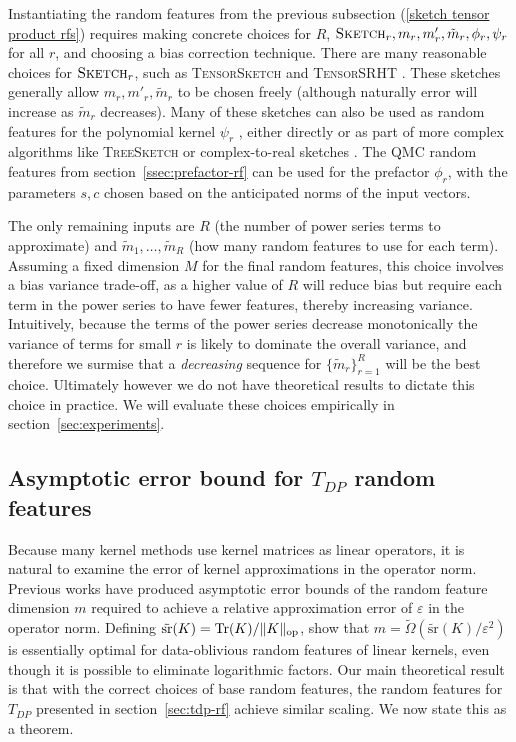 Instantiating the random features from the previous subsection (\ref{sketch tensor product rfs})
requires making concrete choices for $R$, $\textsc{Sketch}_r,m_r,m'_r,\tilde{m}_r,\phi_r,\psi_r$ for all $r$,
and choosing a bias correction technique.
There are many reasonable choices for $\textsc{Sketch}_r$, such as
\textsc{TensorSketch} \citep{pham2013fast}
and \textsc{TensorSRHT} \citep{ahle2020oblivious}.
These sketches generally allow $m_r,m'_r,\tilde{m}_r$ to be chosen freely
(although naturally error will increase as $\tilde{m}_r$ decreases).
Many of these sketches can also be used as random features for the polynomial kernel $\psi_r$ \citep{wacker2022improved},
either directly or as part of more complex algorithms like  \textsc{TreeSketch} \citep{ahle2020oblivious}
or complex-to-real sketches \citep{wacker2023complextoreal}.
The QMC random features from section~\ref{ssec:prefactor-rf} can be used for the prefactor $\phi_r$,
with the parameters $s,c$ chosen based on the anticipated norms of the input vectors.

The only remaining inputs are $R$ (the number of power series terms to approximate)
and $\tilde{m}_1,\ldots,\tilde{m}_R$ (how many random features to use for each term).
Assuming a fixed dimension $M$ for the final random features,
this choice involves a bias variance trade-off,
as a higher value of $R$ will reduce bias but require each term in the power series
to have fewer features, thereby increasing variance.
Intuitively, because the terms of the power series decrease monotonically
the variance of terms for small $r$ is likely to dominate the overall variance,
and therefore we surmise that a \emph{decreasing} sequence for $\{\tilde{m}_r\}_{r=1}^R$
will be the best choice.
Ultimately however we do not have theoretical results to dictate this choice in practice.
We will evaluate these choices empirically in section~\ref{sec:experiments}.











\subsection{Asymptotic error bound for $T_{DP}$ random features}\label{sec:tdp-error-bound}

Because many kernel methods use kernel matrices as linear operators,
it is natural to examine the error of kernel approximations in the operator norm.
Previous works have produced asymptotic error bounds
of the random feature dimension $m$ required to achieve a
relative approximation error of $\varepsilon$ in the operator norm.
Defining $\tilde{\text{sr}}(K) = \textnormal{Tr}(K)/\|K\|_\text{op}$,
\citet{cohen2015optimal} show that $m=\tilde\Omega(\tilde{\text{sr}}(K)/\varepsilon^2)$
is essentially optimal for data-oblivious random features of linear kernels, even though it is possible to eliminate logarithmic factors.
Our main theoretical result is that with the correct choices of base random features,
the random features for $T_{DP}$ presented in section~\ref{sec:tdp-rf} achieve similar scaling.
We now state this as a theorem.

